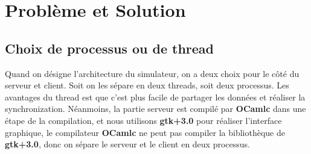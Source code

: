 \documentclass[14px]{article}
\begin{document}
\begin{enumerate}
\begin{figure}[htbp]
{\begin{minipage}[t]{0.3\linewidth}
			\end{minipage}%
		}%
		\centering
	\end{figure}

\end{enumerate}
\clearpage

\section{Problème et Solution}
\subsection{Choix de processus ou de thread}
Quand on désigne l'architecture du simulateur, on a deux choix pour le côté du serveur et client. Soit on les sépare en deux threads, soit deux processus. Les avantages du thread est que c'est plus facile de partager les données et réaliser la synchronization. Néanmoins, la partie serveur est compilé par \textbf{OCamlc} dans une étape de la compilation, et nous utilisons \textbf{gtk+3.0} pour réaliser l'interface graphique, le compilateur \textbf{OCamlc} ne peut pas compiler la bibliothèque de \textbf{gtk+3.0}, donc on sépare le serveur et le client en deux processus.
\end{document}
